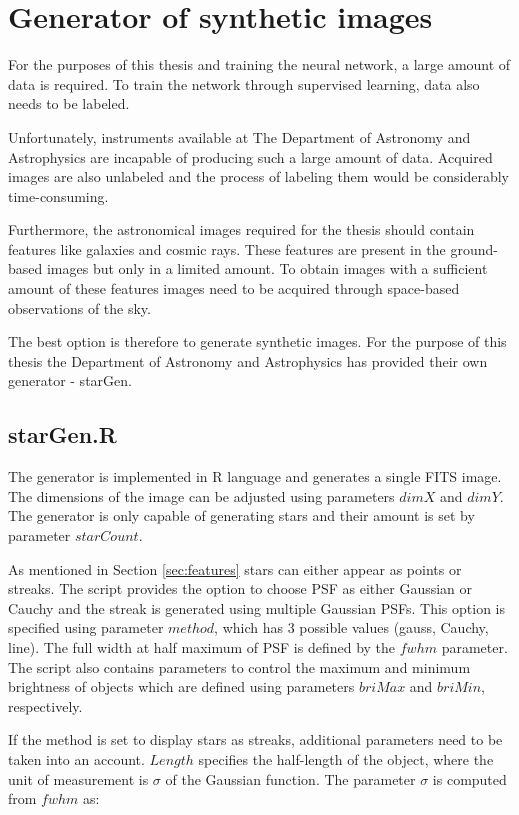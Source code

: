 \section{Generator of synthetic images}

For the purposes of this thesis and training the neural network, a large amount of data is required. To train the network through supervised learning, data also needs to be labeled. 

Unfortunately, instruments available at The Department of Astronomy and Astrophysics are incapable of producing such a large amount of data. Acquired images are also unlabeled and the process of labeling them would be considerably time-consuming.  

Furthermore, the astronomical images required for the thesis should contain features like galaxies and cosmic rays. These features are present in the ground-based images but only in a limited amount. To obtain images with a sufficient amount of these features images need to be acquired through space-based observations of the sky. 

The best option is therefore to generate synthetic images. For the purpose of this thesis the Department of Astronomy and Astrophysics has provided their own generator - starGen. 

\subsection{starGen.R}
The generator \cite{thesisKyselica} is implemented in R language and generates a single FITS image. 
The dimensions of the image can be adjusted using parameters $dimX$ and $dimY$. The generator is only capable of generating stars and their amount is set by parameter $starCount$. 

As mentioned in Section \ref{sec:features} stars can either appear as points or streaks. The script provides the option to choose PSF as either Gaussian or Cauchy and the streak is generated using multiple Gaussian PSFs. This option is specified using parameter $method$, which has 3 possible values (gauss, Cauchy, line). The full width at half maximum of PSF is defined by the $fwhm$ parameter. 
The script also contains parameters to control the maximum and minimum brightness of objects which are defined using parameters $briMax$ and $briMin$, respectively. 

If the method is set to display stars as streaks, additional parameters need to be taken into an account. $Length$ specifies the half-length of the object, where the unit of measurement is $\sigma$ of the Gaussian function. The parameter $\sigma$ is computed from $fwhm$ as:


